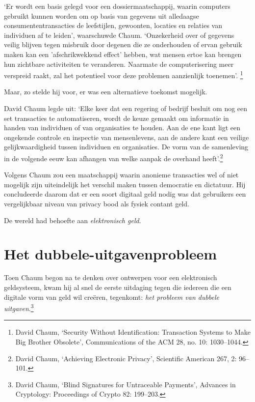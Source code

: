 \documentclass[smalldemyvopaper,11pt,twoside,onecolumn,openright,extrafontsizes,hidelinks]{memoir}
\begin{document}
`Er wordt een basis gelegd voor een dossiermaatschappij, waarin
computers gebruikt kunnen worden om op basis van gegevens uit alledaagse
consumententransacties de leefstijlen, gewoonten, locaties en relaties
van individuen af te leiden', waarschuwde Chaum. `Onzekerheid over of
gegevens veilig blijven tegen misbruik door degenen die ze onderhouden
of ervan gebruik maken kan een 'afschrikwekkend effect' hebben, wat
mensen ertoe kan brengen hun zichtbare activiteiten te veranderen.
Naarmate de computerisering meer verspreid raakt, zal het potentieel
voor deze problemen aanzienlijk toenemen'. \footnote{David Chaum,
  `Security Without Identification: Transaction Systems to Make Big
  Brother Obsolete', Communications of the ACM 28, no. 10: 1030--1044.}

Maar, zo stelde hij voor, er was een alternatieve toekomst mogelijk.

David Chaum legde uit: `Elke keer dat een regering of bedrijf besluit om
nog een set transacties te automatiseren, wordt de keuze gemaakt om
informatie in handen van individuen of van organisaties te houden. Aan
de ene kant ligt een ongekende controle en inspectie van mensenlevens,
aan de andere kant een veilige gelijkwaardigheid tussen individuen en
organisaties. De vorm van de samenleving in de volgende eeuw kan
afhangen van welke aanpak de overhand heeft'.\footnote{David Chaum,
  `Achieving Electronic Privacy', Scientific American 267, 2: 96--101.}

Volgens Chaum zou een maatschappij waarin anonieme transacties wel of
niet mogelijk zijn uiteindelijk het verschil maken tussen democratie en
dictatuur. Hij concludeerde daarom dat er een soort digitaal geld nodig
was dat gebruikers een vergelijkbaar niveau van privacy bood als fysiek
contant geld.

De wereld had behoefte aan \emph{elektronisch geld}.

\section{Het
dubbele-uitgavenprobleem}\label{het-dubbele-uitgavenprobleem}

Toen Chaum begon na te denken over ontwerpen voor een elektronisch
geldsysteem, kwam hij al snel de eerste uitdaging tegen die iedereen die
een digitale vorm van geld wil creëren, tegenkomt: \emph{het probleem
van dubbele uitgaven}.\footnote{David Chaum, `Blind Signatures for
  Untraceable Payments', Advances in Cryptology: Proceedings of Crypto
  82: 199--203.}
\end{document}
